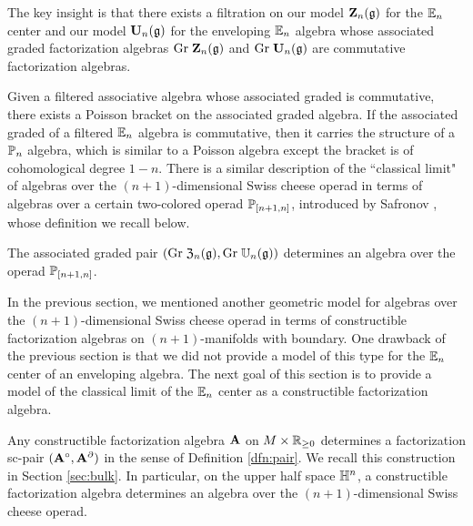 \documentclass[11pt]{amsart}
\numberwithin{equation}{section}
\begin{document}
The key insight is that there exists a filtration on our model $\mathbf Z_n(\mathfrak g)$ for the $\mathbb E_n$ center and our model $\mathbf U_n (\mathfrak g)$ for the enveloping $\mathbb E_n$ algebra  whose associated graded factorization algebras ${\rm Gr} \; \mathbf Z_n(\mathfrak g)$ and ${\rm Gr} \; \mathbf U_n(\mathfrak g)$ are commutative factorization algebras. 

Given a filtered associative algebra whose associated graded is commutative, there exists a Poisson bracket on the associated graded algebra. 
If the associated graded of a filtered $\mathbb E_n$ algebra is commutative, then it carries the structure of a $\mathbb P_n$ algebra, which is similar to a Poisson algebra except the bracket is of cohomological degree $1-n$. 
There is a similar description of the ``classical limit"  of algebras over the $(n+1)$-dimensional Swiss cheese operad in terms of algebras over a certain two-colored operad $\mathbb P_{[n+1,n]}$, introduced by Safronov \cite{Pavel1, Pavel2}, whose definition we recall below.

\begin{prp} 
\label{prp:poisson}
The associated graded pair $({\rm Gr} \; \mathfrak Z_n(\mathfrak g) , {\rm Gr} \; \mathbb U_n(\mathfrak g))$ determines an algebra over the operad $\mathbb P_{[n+1,n]}$. 
\end{prp}



In the previous section, we mentioned another geometric model for algebras over the $(n+1)$-dimensional Swiss cheese operad in terms of constructible factorization algebras on $(n+1)$-manifolds with boundary.
One drawback of the previous section is that we did not provide a model of this type for the $\mathbb E_n$ center of an enveloping algebra. 
The next goal of this section is to provide a model of the classical limit of the $\mathbb E_n$ center as a constructible factorization algebra. 

Any constructible factorization algebra $\mathbf A$ on $M \times \mathbb R_{\geq 0}$ determines a factorization sc-pair $(\mathbf A^\circ , \mathbf A^{\partial})$ in the sense of Definition \ref{dfn:pair}.
We recall this construction in Section \ref{sec:bulk}. 
In particular, on the upper half space $\mathbb H^n$, a constructible factorization algebra determines an algebra over the $(n+1)$-dimensional Swiss cheese operad. 
\end{document}
